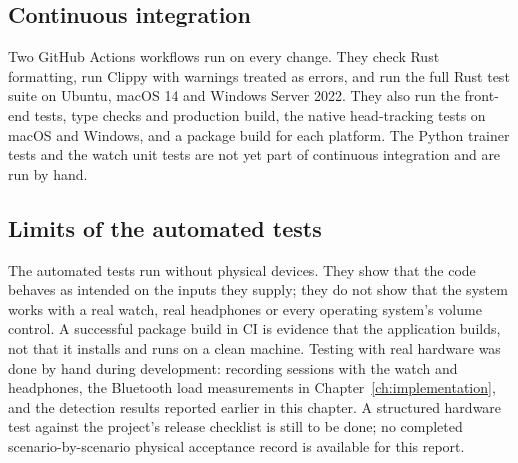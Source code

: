 \subsection{Continuous integration}

Two GitHub Actions workflows run on every change. They check Rust formatting, run Clippy with warnings treated as errors, and run the full Rust test suite on Ubuntu, macOS 14 and Windows Server 2022. They also run the front-end tests, type checks and production build, the native head-tracking tests on macOS and Windows, and a package build for each platform. The Python trainer tests and the watch unit tests are not yet part of continuous integration and are run by hand.

\subsection{Limits of the automated tests}

The automated tests run without physical devices. They show that the code behaves as intended on the inputs they supply; they do not show that the system works with a real watch, real headphones or every operating system's volume control. A successful package build in CI is evidence that the application builds, not that it installs and runs on a clean machine. Testing with real hardware was done by hand during development: recording sessions with the watch and headphones, the Bluetooth load measurements in Chapter~\ref{ch:implementation}, and the detection results reported earlier in this chapter. A structured hardware test against the project's release checklist is still to be done; no completed scenario-by-scenario physical acceptance record is available for this report.
